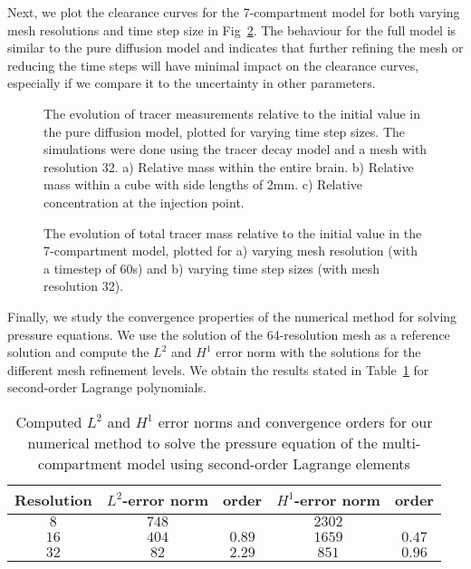 \documentclass[a4paper,11pt]{article}
\newcommand{\1}{^{(1)}}
\newcommand{\2}{^{(2)}}
\begin{document}
Next, we plot the clearance curves for the 7-compartment model for both varying mesh resolutions and time step size in Fig~\ref{fig: 7comp convergence}. The behaviour for the full model is similar to the pure diffusion model and indicates that further refining the mesh or reducing the time steps will have minimal impact on the clearance curves, especially if we compare it to the uncertainty in other parameters.

\begin{figure}[hbt]
    \centering
    \caption{The evolution of tracer measurements relative to the initial value in the pure diffusion model, plotted for varying time step sizes. The simulations were done using the tracer decay model and a mesh with resolution 32. a) Relative mass within the entire brain. b) Relative mass within a cube with side lengths of 2mm. c) Relative concentration at the injection point.}
    \label{fig: diffusion time step size}
\end{figure}


\begin{figure}[hbt]
    \centering
    \caption{The evolution of total tracer mass relative to the initial value in the 7-compartment model, plotted for a) varying mesh resolution (with a timestep of 60s) and b) varying time step sizes (with mesh resolution 32).}
    \label{fig: 7comp convergence}
\end{figure}

Finally, we study the convergence properties of the numerical method for solving pressure equations. We use the solution of the 64-resolution mesh as a reference solution and compute the $L^2$ and $H^1$ error norm with the solutions for the different mesh refinement levels. We obtain the results stated in Table~\ref{tab:error-pressure} for second-order Lagrange polynomials. 
\begin{table}[h]
    \centering
    \begin{tabular}{c|c|c|c|c}
         Resolution & $L^2$-error norm & order & $H^1$-error norm & order \\
         \hline 
         $8$ & $748$ & & $2302$ &  \\
         $16$ & $404$ & $0.89$ & $1659$ & $0.47$\\
         $32$ & $82$ & $2.29$ & $851$ &  $0.96$ \\
    \end{tabular}
    \caption{Computed $L^2$ and $H^1$ error norms and convergence orders for our numerical method to solve the pressure equation of the multi-compartment model using second-order Lagrange elements}
    \label{tab:error-pressure}
\end{table}
\FloatBarrier


\end{document}
